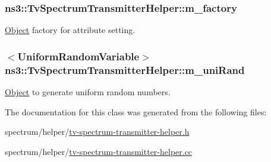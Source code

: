 \subsubsection[{\texorpdfstring{m\+\_\+factory}{m_factory}}]{ ns3\+::\+Tv\+Spectrum\+Transmitter\+Helper\+::m\+\_\+factory\hspace{0.3cm}{\ttfamily [private]}}\hypertarget{classns3_1_1TvSpectrumTransmitterHelper_ae89194664bc52ed899f7dd0d074e588c}{}\label{classns3_1_1TvSpectrumTransmitterHelper_ae89194664bc52ed899f7dd0d074e588c}


\hyperlink{classns3_1_1Object}{Object} factory for attribute setting. 

\subsubsection[{\texorpdfstring{m\+\_\+uni\+Rand}{m_uniRand}}]{$<${\bf Uniform\+Random\+Variable}$>$ ns3\+::\+Tv\+Spectrum\+Transmitter\+Helper\+::m\+\_\+uni\+Rand\hspace{0.3cm}{\ttfamily [private]}}\hypertarget{classns3_1_1TvSpectrumTransmitterHelper_ac0914f5455dbfa49826f0879635693e6}{}\label{classns3_1_1TvSpectrumTransmitterHelper_ac0914f5455dbfa49826f0879635693e6}


\hyperlink{classns3_1_1Object}{Object} to generate uniform random numbers. 



The documentation for this class was generated from the following files\+:\begin{DoxyCompactItemize}
\item 
spectrum/helper/\hyperlink{tv-spectrum-transmitter-helper_8h}{tv-\/spectrum-\/transmitter-\/helper.\+h}\item 
spectrum/helper/\hyperlink{tv-spectrum-transmitter-helper_8cc}{tv-\/spectrum-\/transmitter-\/helper.\+cc}\end{DoxyCompactItemize}
